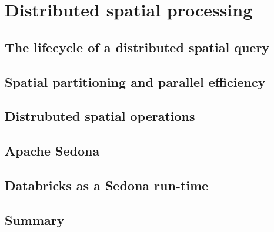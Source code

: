 \section{Distributed spatial processing}
\subsection{The lifecycle of a distributed spatial query}
\subsection{Spatial partitioning and parallel efficiency}
\subsection{Distrubuted spatial operations}
\subsection{Apache Sedona}
\subsection{Databricks as a Sedona run-time}
\subsection{Summary}
